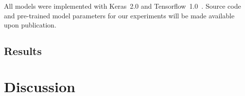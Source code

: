 \documentclass{article}
\begin{document}

All models were implemented with Keras~2.0 and Tensorflow~1.0~\cite{chollet2015keras, tensorflow2015-whitepaper}.
Source code and pre-trained model parameters for our experiments will be made available upon publication.

\subsection{Results}

\section{Discussion}



\end{document}

